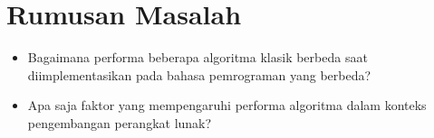 



\section{Rumusan Masalah}
\label{sec:rumusanMasalah}

\begin{itemize}
	\item Bagaimana performa beberapa algoritma klasik berbeda saat diimplementasikan pada bahasa pemrograman yang berbeda?
	\item Apa saja faktor yang mempengaruhi performa algoritma dalam konteks pengembangan perangkat lunak?
\end{itemize}

